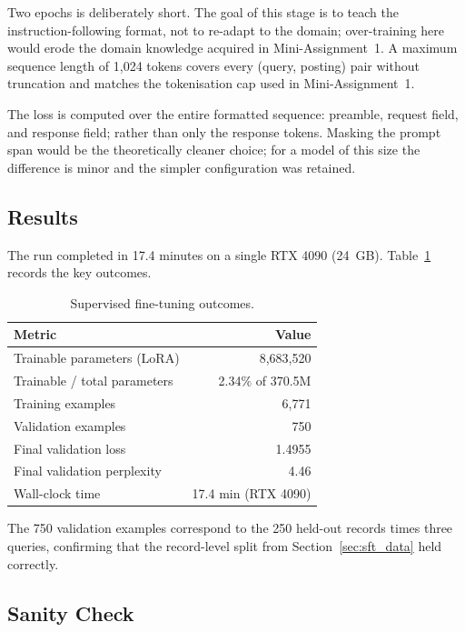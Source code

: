 \documentclass[../main.tex]{subfiles}
\begin{document}
Two epochs is deliberately short. The goal of this stage is to teach the instruction-following format, not to re-adapt to the domain; over-training here would erode the domain knowledge acquired in Mini-Assignment~1. A maximum sequence length of 1{,}024 tokens covers every (query, posting) pair without truncation and matches the tokenisation cap used in Mini-Assignment~1.

The loss is computed over the entire formatted sequence: preamble, request field, and response field; rather than only the response tokens. Masking the prompt span would be the theoretically cleaner choice; for a model of this size the difference is minor and the simpler configuration was retained.

\subsection{Results}
\label{sec:sft_results}

The run completed in 17.4 minutes on a single RTX 4090 (24~GB). Table~\ref{tab:sft_results} records the key outcomes.

\begin{table}[h]
\centering
\small
\begin{tabular}{lr}
\toprule
\textbf{Metric} & \textbf{Value} \\
\midrule
Trainable parameters (LoRA) & 8{,}683{,}520 \\
Trainable / total parameters & 2.34\% of 370.5M \\
Training examples & 6{,}771 \\
Validation examples & 750 \\
Final validation loss & 1.4955 \\
Final validation perplexity & 4.46 \\
Wall-clock time & 17.4 min (RTX 4090) \\
\bottomrule
\end{tabular}
\caption{Supervised fine-tuning outcomes.}
\label{tab:sft_results}
\end{table}

The 750 validation examples correspond to the 250 held-out records times three queries, confirming that the record-level split from Section~\ref{sec:sft_data} held correctly.

\subsection{Sanity Check}
\label{sec:sft_sanity}
\end{document}
